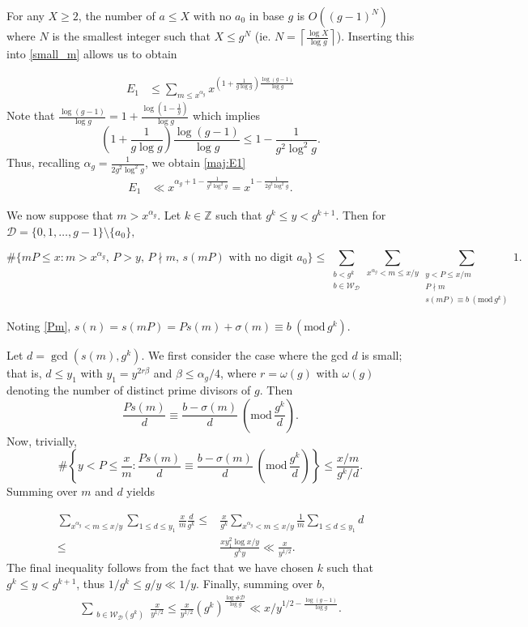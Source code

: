 \documentclass[11pt, reqno]{amsart}
\theoremstyle{remark}
\numberwithin{theorem}{section}
\numberwithin{proposition}{section}
\numberwithin{lemma}{section}
\numberwithin{corollary}{section}
\numberwithin{equation}{section}
\numberwithin{conjecture}{section}
\numberwithin{definition}{section}
\renewcommand{\bmod}[1]{\ ( \mathrm{mod} \, #1 )}
\begin{document}
 
For any $X\ge 2$, the number of $a\leqslant X$ with no $a_0$ in base $g$ is $O((g-1)^N)$ where $N$ is the smallest integer such that $X\le g^N$  (ie. $N=\left\lceil \frac{\log X}{\log g}\right\rceil$).
Inserting this into \eqref{small_m} allows us to obtain

\begin{align*}
E_1&\leq \sum_{m\le x^{\alpha_g}}x^{(1+\frac{1}{g\log g})\frac{\log (g-1)}{\log g}}
\end{align*}
Note that $\frac{\log (g-1)}{\log g}=1+\frac{\log\left(1-\frac1g\right)}{\log g}$ which implies
\[\left(1+\frac{1}{g\log g}\right)\frac{\log (g-1)}{\log g} \leq 1-\frac{1}{g^2\log ^2g}.\]
Thus, recalling $\alpha_g =\frac{1}{2g^2\log ^2g}$, we obtain \eqref{maj:E1}
\begin{align*}
E_1&\ll  x^{\alpha_g+1-\frac{1}{g^2\log^2 g}} =x^{1-\frac{1}{2g^2\log ^2g}}.
\end{align*}





We now suppose that $m> x^{\alpha_g}$.
Let $k\in\mathbb{Z}$ such that $g^{k} \leqslant y<g^{k+1}$. Then  for $\mathcal{D}=\{0,1,\dots,g-1\}\setminus\{a_0\},$
		
		$$\#\{m P\leqslant x: m>x^{\alpha_g},\, P> y,\,P\nmid m,\,  s(mP) \text{ with no digit $a_0$} \}\leqslant \sum_{\substack{b<g^{k}\\b\in \mathcal{W}_{\mathcal {D}}}} \sum_{x^{\alpha_g}<m\leq x/y } \sum_{\substack{y<P\leq x/m\\P\nmid m\\s(mP) \equiv b \bmod {g^k} }} 1.
		$$
		
Noting \eqref{Pm}, $s(n)=s(mP)=Ps(m)+\sigma(m) \equiv b \bmod {g^{k}}$.

Let $d=\gcd(s(m), g^{k}). $
	We first consider the case where the gcd $d$ is small; that is, $d \leq y_{1}$ with $y_{1}= y^{2r\beta}$ and $\beta\leq \alpha_g/4$, where $r= \omega(g)$ with $\omega(g)$ denoting the number of distinct prime divisors of $g$. Then
	$$
	\frac{Ps(m)}{d}\equiv\frac{b-\sigma(m)}{d} \bmod{\frac{g^{k}}{d}}.
	$$
	Now, trivially, 
	$$\#\left\{y<P \leq \frac{x}{m}: 
	\frac{Ps(m)}{d}\equiv\frac{b-\sigma(m)}{d} \bmod{\frac{g^{k}}{d}}
	 \right\} \leqslant \frac{x/m}{g^{k} / d}.$$
Summing over $m$ and  $d$ yields 
	
\begin{align*}
	\sum_{x^{\alpha_g}<m\leq x/y} \sum_{1\le d \le y_{1}} \frac{x}{m} \frac{d}{g^{k}} \le& \frac{x}{g^k}\sum_{x^{\alpha_g}<m\leq x/y}\frac{1}{m} \sum_{1\le d \le y_{1}}d\\\le& 
 \frac{xy_1^2 \log{x/y}}{g^ky}\ll \frac{x}{y^{1/2}}.
\end{align*}
The final inequality follows from the fact that we have chosen $k$ such that $g^k\leqslant y<g^{k+1}$, thus $1/g^k\leqslant g/y\ll 1/y$.
Finally, summing over $b$, 
\begin{align*}
	\sum_{\substack{b\in \mathcal{W}_{\mathcal{D}}(g^k)}} \frac{x}{y^{1/2}}\leq \frac{x}{y^{1/2}}(g^k)^{\frac{\log \#\mathcal{D}}{\log g}}\ll x/y^{1/2-\frac{\log (g-1)}{\log g}}.
\end{align*} 
\end{document}
